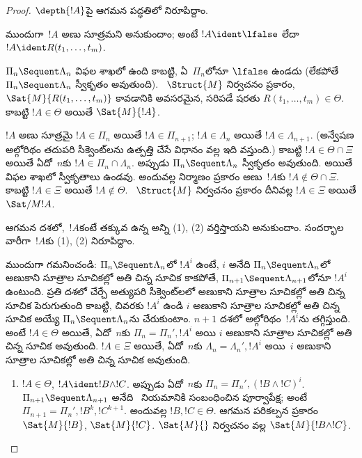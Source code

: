 \documentclass[../../../include/open-logic-section]{subfiles}
\begin{document}
\begin{proof}
  $\depth{!A}$పై ఆగమన పద్ధతిలో నిరూపిద్దాం.

ముందుగా~$!A$ అణు సూత్రమని అనుకుందాం; అంటే $!A \ident \lfalse$ లేదా $!A
\ident R(t_1, \dots, t_m)$.

$\Pi_n \Sequent \Lambda_n$ విఫల శాఖలో ఉంది కాబట్టి, ఏ~$\Pi_n$లోనూ $\lfalse$ ఉండదు (లేకపోతే $\Pi_n \Sequent \Lambda_n$ స్వీకృతం అవుతుంది). ~$\Struct{M}$ నిర్వచనం ప్రకారం, $\Sat{M}{R(t_1, \dots, t_m)}$ కావడానికి అవసరమైన, సరిపడే షరతు $R(t_1, \dots, t_m) \in
\Theta$. కాబట్టి $!A \in
\Theta$ అయితే $\Sat{M}{!A}$.

$!A$ అణు సూత్రమై $!A \in \Pi_n$ అయితే $!A \in \Pi_{n+1}$; $!A \in \Lambda_n$ అయితే $!A \in \Lambda_{n+1}$. (అన్వేషణ అల్గోరిథం తదుపరి సీక్వెంట్‌లను ఉత్పత్తి చేసే విధానం వల్ల ఇది వస్తుంది.) కాబట్టి $!A \in \Theta \cap \Xi$ అయితే ఏదో~$n$కు $!A \in \Pi_n \cap
\Lambda_n$. అప్పుడు $\Pi_n \Sequent \Lambda_n$ స్వీకృతం అవుతుంది. అయితే విఫల శాఖలో స్వీకృతాలు ఉండవు. అందువల్ల నిర్మాణం ప్రకారం అణు~$!A$కు $!A \notin \Theta
\cap \Xi$. కాబట్టి $!A \in
\Xi$ అయితే $!A \notin \Theta$. ~$\Struct{M}$ నిర్వచనం ప్రకారం దీనివల్ల $!A \in \Xi$ అయితే $\Sat/{M}{!A}$.

ఆగమన దశలో,~$!A$కంటే తక్కువ  ఉన్న అన్ని  (1), (2) వర్తిస్తాయని అనుకుందాం. సందర్భాల వారీగా~$!A$కు (1), (2) నిరూపిద్దాం.

ముందుగా గమనించండి: $\Pi_n \Sequent \Lambda_n$లో $!A^i$ ఉంటే, $i$ అనేది $\Pi_n \Sequent \Lambda_n$లో అణుకాని సూత్రాల సూచికల్లో అతి చిన్న సూచిక కాకపోతే, $\Pi_{n+1} \Sequent \Lambda_{n+1}$లోనూ $!A^i$ ఉంటుంది. ప్రతి దశలో చేర్చే అత్యుపరి సీక్వెంట్‌లలో అణుకాని సూత్రాల సూచికల్లో అతి చిన్న సూచిక పెరుగుతుంది కాబట్టి, చివరకు $!A^i$ ఉండి $i$ అణుకాని సూత్రాల సూచికల్లో అతి చిన్న సూచిక అయ్యే $\Pi_n \Sequent \Lambda_n$ను చేరుకుంటాం. $n+1$ దశలో అల్గోరిథం~$!A^i$ను తగ్గిస్తుంది. అంటే $!A \in \Theta$ అయితే, ఏదో~$n$కు $\Pi_n = \Pi_n',
!A^i$ అయి $i$ అణుకాని సూత్రాల సూచికల్లో అతి చిన్న సూచిక అవుతుంది. $!A \in \Xi$ అయితే, ఏదో~$n$కు $\Lambda_n = \Lambda_n', !A^i$ అయి~$i$ అణుకాని సూత్రాల సూచికల్లో అతి చిన్న సూచిక అవుతుంది.

\begin{enumerate}
  \item $!A \in \Theta$, $!A \ident !B \land !C$. అప్పుడు ఏదో~$n$కు $\Pi_n = \Pi_n', (!B \land !C)^i$. $\Pi_{n+1} \Sequent
  \Lambda_{n+1}$ అనేది~\LeftR{\land} నియమానికి సంబంధించిన పూర్వాపేక్ష; అంటే $\Pi_{n+1} = \Pi_n', !B^k, !C^{k+1}$. అందువల్ల $!B, !C \in
  \Theta$. ఆగమన పరికల్పన ప్రకారం $\Sat{M}{!B}$, $\Sat{M}{!C}$. $\Sat{M}{}$ నిర్వచనం వల్ల $\Sat{M}{!B \land !C}$.


\end{enumerate}
\end{proof}
\end{document}
